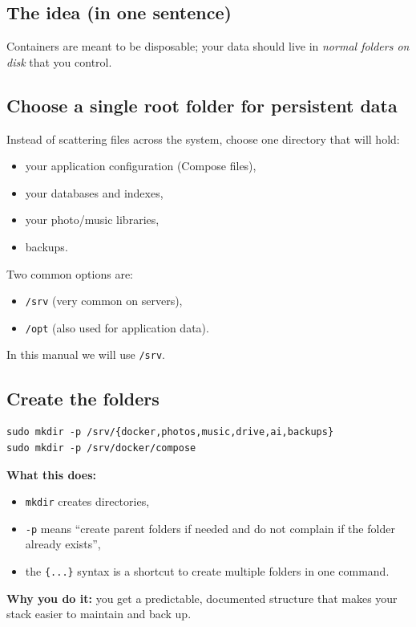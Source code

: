 \subsection*{The idea (in one sentence)}
Containers are meant to be disposable; your data should live in \emph{normal folders on disk} that you control.

\subsection*{Choose a single root folder for persistent data}
Instead of scattering files across the system, choose one directory that will hold:
\begin{itemize}[leftmargin=*]
  \item your application configuration (Compose files),
  \item your databases and indexes,
  \item your photo/music libraries,
  \item backups.
\end{itemize}

Two common options are:
\begin{itemize}[leftmargin=*]
  \item \texttt{/srv} (very common on servers),
  \item \texttt{/opt} (also used for application data).
\end{itemize}

In this manual we will use \texttt{/srv}.

\subsection*{Create the folders}
\begin{lstlisting}
sudo mkdir -p /srv/{docker,photos,music,drive,ai,backups}
sudo mkdir -p /srv/docker/compose
\end{lstlisting}

\textbf{What this does:}
\begin{itemize}[leftmargin=*]
  \item \texttt{mkdir} creates directories,
  \item \texttt{-p} means ``create parent folders if needed and do not complain if the folder already exists'',
  \item the \texttt{\{...\}} syntax is a shortcut to create multiple folders in one command.
\end{itemize}

\textbf{Why you do it:} you get a predictable, documented structure that makes your stack easier to maintain and back up.

